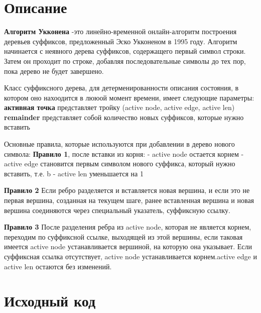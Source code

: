 \section{Описание}

\textbf{Алгоритм Укконена} -это линейно-временной онлайн-алгоритм построения деревьев суффиксов, предложенный Эско Укконеном в 1995 году. Алгоритм начинается с неявного дерева суффиксов, содержащего первый символ строки. Затем он проходит по строке, добавляя последовательные символы до тех пор, пока дерево не будет завершено.

Класс суффиксного дерева, для детерменированности описания состояния, в котором оно нахоодится в лююой момент времени, имеет следующие параметры:\newline
\textbf{активная точка} представляет тройку (active node, active edge, active len)\newline
\textbf{remainder} представляет собой количество новых суффиксов, которые нужно вставить\newline

Основные правила, которые используются при добавлении в дерево нового символа:
\textbf{Правило 1}, после вставки из корня:\newline
- active node остается корнем\newline
- active edge становится первым символом нового суффикса, который нужно вставить, т.е. b\newline
- active len уменьшается на 1\newline

\textbf{Правило 2}\newline
Если ребро разделяется и вставляется новая вершина, и если это не первая вершина, созданная на текущем шаге, ранее вставленная вершина и новая вершина соединяются через специальный указатель, суффиксную ссылку.\newline

\textbf{Правило 3}\newline
После разделения ребра из active node, которая не является корнем, переходим по суффиксной ссылке, выходящей из этой вершины, если таковая имеется active node устанавливается вершиной, на которую она указывает. Если суффиксная ссылка отсутствует, active node устанавливается корнем.active edge и active len остаются без изменений.\newline


\section{Исходный код}

